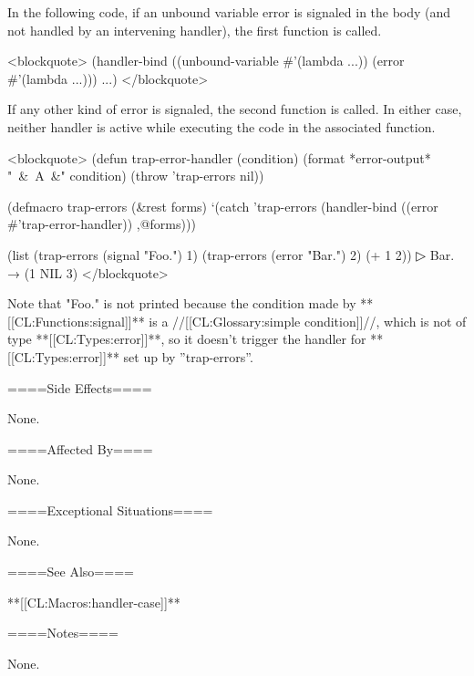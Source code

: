 In the following code, if an unbound variable error is signaled in the body (and not handled by an intervening handler), the first function is called.

<blockquote> (handler-bind ((unbound-variable #'(lambda ...)) (error #'(lambda ...))) ...) </blockquote>

If any other kind of error is signaled, the second function is called. In either case, neither handler is active while executing the code in the associated function.

<blockquote> (defun trap-error-handler (condition) (format *error-output* "~&~A~&" condition) (throw 'trap-errors nil))

(defmacro trap-errors (&rest forms) `(catch 'trap-errors (handler-bind ((error #'trap-error-handler)) ,@forms)))

(list (trap-errors (signal "Foo.") 1) (trap-errors (error "Bar.") 2) (+ 1 2))
▷ Bar. → (1 NIL 3) </blockquote>

Note that "Foo." is not printed because the condition made by **[[CL:Functions:signal]]** is a //[[CL:Glossary:simple condition]]//, which is not of type **[[CL:Types:error]]**, so it doesn't trigger the handler for **[[CL:Types:error]]** set up by ''trap-errors''.

====Side Effects====

None.

====Affected By====

None.

====Exceptional Situations====

None.

====See Also====

**[[CL:Macros:handler-case]]**

====Notes====

None.

